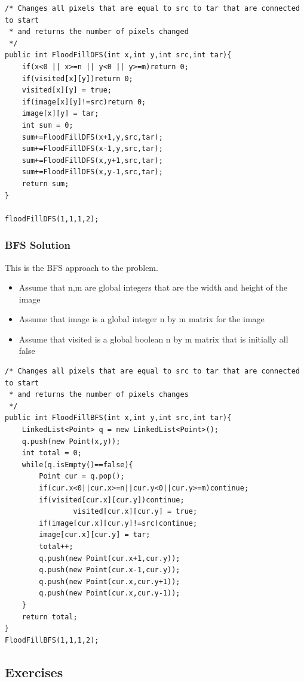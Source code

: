 \documentclass[11pt,oneside]{book}
\begin{document}
\begin{lstlisting}
/* Changes all pixels that are equal to src to tar that are connected to start
 * and returns the number of pixels changed
 */
public int FloodFillDFS(int x,int y,int src,int tar){
    if(x<0 || x>=n || y<0 || y>=m)return 0;
    if(visited[x][y])return 0;
    visited[x][y] = true;
    if(image[x][y]!=src)return 0;
    image[x][y] = tar;
    int sum = 0;
    sum+=FloodFillDFS(x+1,y,src,tar);
    sum+=FloodFillDFS(x-1,y,src,tar);
    sum+=FloodFillDFS(x,y+1,src,tar);
    sum+=FloodFillDFS(x,y-1,src,tar);
    return sum;
}

floodFillDFS(1,1,1,2);
\end{lstlisting}

\subsubsection{BFS Solution}

This is the BFS approach to the problem.

\begin{itemize}
\item Assume that n,m are global integers that are the width and height of the image
\item Assume that image is a global integer n by m matrix for the image
\item Assume that visited is a global boolean n by m matrix that is initially all false
\end{itemize}

\begin{lstlisting}
/* Changes all pixels that are equal to src to tar that are connected to start
 * and returns the number of pixels changes 
 */
public int FloodFillBFS(int x,int y,int src,int tar){
    LinkedList<Point> q = new LinkedList<Point>();
    q.push(new Point(x,y));
    int total = 0;
    while(q.isEmpty()==false){
        Point cur = q.pop();
        if(cur.x<0||cur.x>=n||cur.y<0||cur.y>=m)continue;
        if(visited[cur.x][cur.y])continue;
                visited[cur.x][cur.y] = true;
        if(image[cur.x][cur.y]!=src)continue;
        image[cur.x][cur.y] = tar;
        total++;
        q.push(new Point(cur.x+1,cur.y));
        q.push(new Point(cur.x-1,cur.y));
        q.push(new Point(cur.x,cur.y+1));
        q.push(new Point(cur.x,cur.y-1));
    }
    return total;
}
FloodFillBFS(1,1,1,2);
\end{lstlisting}

\subsection{Exercises}
\end{document}
